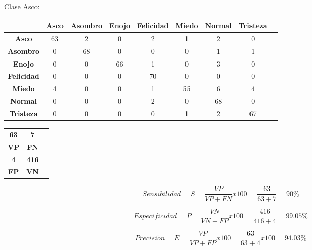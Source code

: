 \vskip 5cm
Clase Asco:

\begin{table}[ht!]
\centering
\begin{tabular}{|c|c|c|c|c|c|c|c|c|} \hline
 & \bf Asco & \bf Asombro & \bf Enojo & \bf Felicidad & \bf Miedo & \bf Normal & \bf Tristeza \\ \hline
\bf Asco & 63 & 2 & 0 & 2 & 1 & 2 & 0 \\ \hline
\bf Asombro & 0 & 68 & 0 & 0 & 0 & 1 & 1 \\ \hline
\bf Enojo & 0 & 0 & 66 & 1 & 0 & 3 & 0 \\ \hline
\bf Felicidad & 0 & 0 & 0 & 70 & 0 & 0 & 0 \\ \hline
\bf Miedo & 4 & 0 & 0 & 1 & 55 & 6 & 4 \\ \hline
\bf Normal & 0 & 0 & 0 & 2 & 0 & 68 & 0 \\ \hline
\bf Tristeza & 0 & 0 & 0 & 0 & 1 & 2 & 67 \\ \hline

\end{tabular}
\end{table}


\begin{table}[ht!]
\centering
\begin{tabular}{|c|c|c|} \hline
\bf 63 \par & \bf 7 \par \\
\bf VP & \bf FN \\ \hline
\bf 4 \par & \bf 416 \par \\ 
\bf FP & \bf VN \\ \hline 
\end{tabular}
\end{table}

\begin{equation}
Sensibilidad=S=\frac{VP}{VP+FN}x100=\frac{63}{63+7}=90\%
\end{equation}

\begin{equation}
Especificidad=P=\frac{VN}{VN+FP}x100=\frac{416}{416+4}=99.05\%
\end{equation}

\begin{equation}
Precisi\acute{o}n=E=\frac{VP}{VP+FP}x100=\frac{63}{63+4}x100=94.03\%
\end{equation}

\vskip 5cm

